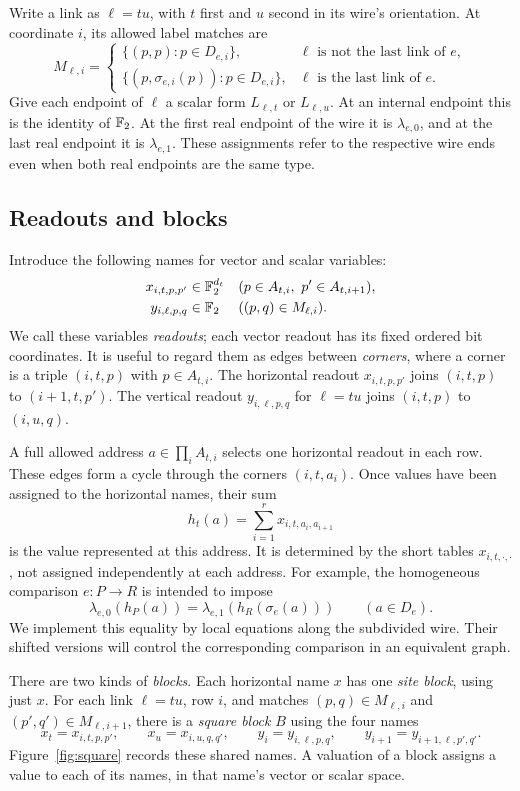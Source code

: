 Write a link as $\ell=tu$, with $t$ first and $u$ second in its
wire's orientation. At coordinate $i$, its allowed label matches
are
\[
M_{\ell,i}=
\begin{cases}
\{(p,p):p\in D_{e,i}\},
 &\ell\text{ is not the last link of }e,\\
\{(p,\sigma_{e,i}(p)):p\in D_{e,i}\},
 &\ell\text{ is the last link of }e.
\end{cases}
\]
Give each endpoint of $\ell$ a scalar form $L_{\ell,t}$ or
$L_{\ell,u}$. At an internal endpoint this is the identity of
$\mathbb F_2$. At the first real endpoint of the wire it is
$\lambda_{e,0}$, and at the last real endpoint it is
$\lambda_{e,1}$. These assignments refer to the respective wire
ends even when both real endpoints are the same type.

\subsection{Readouts and blocks}

Introduce the following names for vector and scalar variables:
\begin{align*}
x_{i,t,p,p'}&\in\mathbb F_2^{d_t}
 &&(p\in A_{t,i},\ p'\in A_{t,i+1}),\\
y_{i,\ell,p,q}&\in\mathbb F_2
 &&((p,q)\in M_{\ell,i}).
\end{align*}
We call these variables \emph{readouts}; each vector readout has its
fixed ordered bit coordinates. It is useful to regard them as edges
between \emph{corners}, where a corner is a triple $(i,t,p)$ with
$p\in A_{t,i}$. The horizontal readout $x_{i,t,p,p'}$ joins
$(i,t,p)$ to $(i+1,t,p')$. The vertical readout
$y_{i,\ell,p,q}$ for $\ell=tu$ joins $(i,t,p)$ to $(i,u,q)$.

A full allowed address $a\in\prod_i A_{t,i}$ selects one horizontal
readout in each row. These edges form a cycle through the corners
$(i,t,a_i)$. Once values have been assigned to the horizontal names,
their sum
\[
                 h_t(a)=\sum_{i=1}^r x_{i,t,a_i,a_{i+1}}
\]
is the value represented at this address. It is determined by the
short tables $x_{i,t,\cdot,\cdot}$, not assigned independently at each
address. For example, the homogeneous comparison $e:P\to R$ is intended
to impose
\[
 \lambda_{e,0}(h_P(a))
     =\lambda_{e,1}(h_R(\sigma_e(a)))
       \qquad(a\in D_e).
\]
We implement this equality by local equations along the subdivided wire.
Their shifted versions will control the corresponding comparison in an
equivalent graph.

There are two kinds of \emph{blocks}. Each horizontal name $x$ has
one \emph{site block}, using just $x$. For each link $\ell=tu$,
row $i$, and matches
$(p,q)\in M_{\ell,i}$ and
$(p',q')\in M_{\ell,i+1}$, there is a \emph{square block} $B$
using the four names
\[
x_t=x_{i,t,p,p'},\qquad x_u=x_{i,u,q,q'},\qquad
y_i=y_{i,\ell,p,q},\qquad
y_{i+1}=y_{i+1,\ell,p',q'}.
\]
Figure~\ref{fig:square} records these shared names. A valuation of
a block assigns a value to each of its names, in that name's vector
or scalar space.


